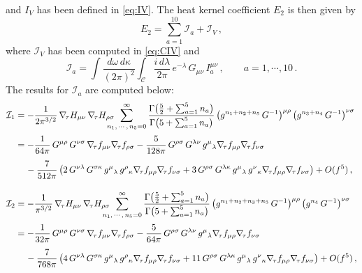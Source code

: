 \documentclass[11pt]{article}
\newcommand{\be}{\begin{equation}}
\newcommand{\ee}{\end{equation}}
\newcommand{\CC}{\mathcal{C}}
\newcommand{\CI}{\mathcal{I}}
\begin{document}
%
and $I_V$ has been defined in \eqref{eq:IV}. The heat kernel coefficient $E_2$ is then given by
%
\be \label{eq:E2sum}
	E_2 = \sum_{a=1}^{10} \CI_a + \CI_V\,,
\ee
%
where $\CI_V$ has been computed in \eqref{eq:CIV} and
%
\be
	\CI_a = \int \frac{d\omega \, d\kappa}{(2\pi)^2} \int_\CC \frac{i \, d\lambda}{2\pi} \, e^{-\lambda} \, G_{\mu\nu} \, I_a^{\mu\nu}\,,
		\qquad
	a = 1, \cdots, 10\,.
\ee
% 
The results for $\CI_a$ are computed below:
%
\begin{align*}
	\CI_1 & = - \frac{1}{2\pi^{3/2}} \, \nabla_{\!\tau} H_{\mu\nu} \, \nabla_{\!\tau} H_{\rho\sigma} 
		\!\!\!\!\!\! \sum_{n_1,\, \cdots,\, n_5 = 0}^\infty \frac{\Gamma\bigl( \frac{5}{2} + \sum_{a=1}^5 n_a\bigr)}{\Gamma \bigl( 5 + \sum_{a=1}^5 n_a \bigr)} \, \bigl( g^{n_1 + n_2 + n_5} \, G^{-1} \bigr)^{\mu\rho} \, \bigl( g^{n_3 + n_4} \, G^{-1} \bigr)^{\nu\sigma} \notag \\[2pt]
		& = - \frac{1}{64 \pi} \, G^{\mu\rho} \, G^{\nu\sigma} \, \nabla_{\!\tau} f_{\mu\nu} \nabla_{\!\tau} f_{\rho\sigma} - \frac{5}{128 \pi} \, G^{\rho\sigma} \, G^{\lambda\nu} \, g^\mu{}_\lambda \nabla_{\!\tau} f_{\mu\rho} \nabla_{\!\tau} f_{\nu\sigma} \notag \\[4pt]
		& \quad\hspace{0.5mm} - \frac{7}{512 \pi} \, \bigl( 2 \, G^{\nu\lambda} \, G^{\sigma \kappa} \, g^\mu{}_\lambda \, g^\rho{}_\kappa \nabla_{\!\tau} f_{\mu\rho} \nabla_{\!\tau} f_{\nu\sigma} + 3 \, G^{\rho\sigma} \, G^{\lambda \kappa} \, g^\mu{}_\lambda \, g^\nu{}_\kappa \nabla_{\!\tau} f_{\mu\rho} \nabla_{\!\tau} f_{\nu\sigma} \bigr) + O (f^5)\,, \\[10pt] 
	\CI_2 & = - \frac{1}{\pi^{3/2}} \, \nabla_{\!\tau} H_{\mu\nu} \, \nabla_{\!\tau} H_{\rho\sigma} 
		\!\!\!\!\!\! \sum_{n_1, \, \cdots, \, n_5 = 0}^\infty \frac{\Gamma \bigl( \tfrac{5}{2} + \sum_{a = 1}^5 n_a \bigr)}{\Gamma \bigl( 5 + \sum_{a = 1}^5 n_a \bigr)} \, \bigl( g^{n_1 + n_2 + n_3 + n_5} \, G^{-1} \bigr)^{\mu\rho} \, \bigl( g^{n_4} \, G^{-1} \bigr)^{\nu\sigma} \notag \\[2pt]
		& = - \frac{1}{32\pi} \, G^{\mu\rho} \, G^{\nu\sigma} \, \nabla_{\!\tau} f_{\mu\nu} \nabla_{\!\tau} f_{\rho\sigma} - \frac{5}{64 \pi} \, G^{\rho\sigma} \, G^{\lambda\nu} \, g^\mu{}_\lambda \nabla_{\!\tau} f_{\mu\rho} \nabla_{\!\tau} f_{\nu\sigma} \notag \\[4pt]
		& \quad\hspace{0.5mm} - \frac{7}{768 \pi} \, \bigl( 4 \, G^{\nu\lambda} \, G^{\sigma \kappa} \, g^\mu{}_\lambda \, g^\rho{}_\kappa \nabla_{\!\tau} f_{\mu\rho} \nabla_{\!\tau} f_{\nu\sigma} + 11 \, G^{\rho\sigma} \, G^{\lambda \kappa} \, g^\mu{}_\lambda \, g^\nu{}_\kappa \nabla_{\!\tau} f_{\mu\rho} \nabla_{\!\tau} f_{\nu\sigma} \bigr) + O (f^5)\,, \\[10pt]

\end{align*}
\end{document}
